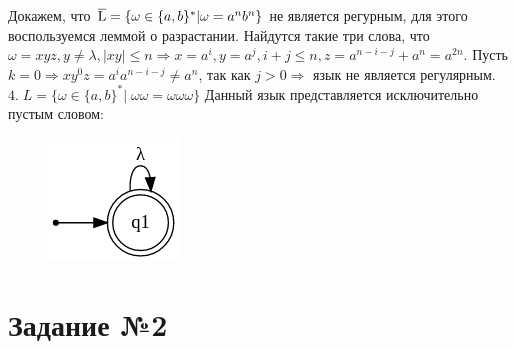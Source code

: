 \documentclass[a4paper,12pt]{article}
\begin{document}
Докажем, что $\overline{\rm L} = {\{\omega \in \{a,b\}^*|\omega = a^nb^n\}}$ не является регурным, для этого воспользуемся леммой о разрастании.
Найдутся такие три слова, что $\omega = xyz, y \ne \lambda, |xy|\leq n \Rightarrow x = a^i, y = a^j, i+j \leq n, z = a^{n-i-j}+a^n=a^{2n}$. Пусть $k=0 \Rightarrow xy^0z=a^ia^{n-i-j}\ne a^n$, так как $j > 0 \Rightarrow$ язык не является регулярным. \newline
\newline$4.\;L = {\{\omega \in \{a,b\}^*|\;\omega\omega = \omega\omega\omega \}}$\newline
Данный язык представляется исключительно пустым словом: \newline
\begin{figure}[h]
\centering
\includegraphics[scale=0.75]{1_4}
\end{figure}\newline

\section*{\Huge Задание №2}
\end{document}
